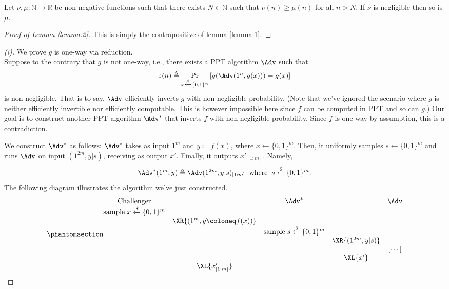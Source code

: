     \begin{lemma}\label{lemma:2}
        Let $\nu,\mu:\mathbb{N}\to \mathbb{R}$ be non-negative functions such that there exists $N\in\mathbb{N}$ such that $\nu(n)\ge \mu(n)$ for all $n\gt N$. If $\nu$ is negligible then so is $\mu$.
    \end{lemma}
    \begin{proof}[Proof of Lemma \ref{lemma:2}]
        This is simply the contrapositive of lemma \ref{lemma:1}.
    \end{proof}
\begin{proof}[(i)]
    We prove $g$ is one-way via reduction.\\
    Suppose to the contrary that $g$ is not one-way, i.e., there exists a PPT algorithm $\Adv$ such that
    \[
    \varepsilon(n)\triangleq \Pr_{x\xleftarrow{\$}\{0,1\}^n}\left[g(\Adv(1^n, g(x))) = g(x)\right]
    \]
    is non-negligible. That is to say, $\Adv$ efficiently inverts $g$ with non-negligible probability. (Note that we've ignored the scenario where $g$ is neither efficiently invertible nor efficiently computable. This is however impossible here since $f$ can be computed in PPT and so can $g$.) Our goal is to construct another PPT algorithm $\Adv^\ast$ that inverts $f$ with non-negligible probability. Since $f$ is one-way by assumption, this is a contradiction.

    We construct $\Adv^\ast$ as follows: $\Adv^\ast$ takes as input $1^{m}$ and $y\coloneq f(x)$, where $x\xleftarrow{}\{0,1\}^m$. Then, it uniformly samples $s\xleftarrow{}\{0,1\}^m$ and runs $\Adv$ on input $(1^{2m}, y|s)$, receiving as output $x'$. Finally, it outputs $x'_{[1:m]}$. Namely,
    \[
    \Adv^\ast(1^{m}, y) \triangleq \Adv(1^{2m}, y|s)_{[1:m]}
    \;\; \text{where} \;\; s\xleftarrow{\$}\{0,1\}^m.
    \]
    \hyperref[diag:adv1]{The following diagram} illustrates the algorithm we've just constructed.
    \[\phantomsection\label{diag:adv1}
        \begin{array}{@{} c c c c c @{}}
        \textrm{Challenger} && \Adv^\ast & & \Adv \\
        \text{sample}\;x\xleftarrow{\$}\{0,1\}^m &&&&\\
        &\XR{(1^m, y\coloneq f(x))} &&&\\
        &&\text{sample}\;s\xleftarrow{\$}\{0,1\}^m &&\\
        &&&\XR{(1^{2m}, y|s)} &\\
        &&&& [\cdots]\\
        &&&\XL{x'} &\\
        &\XL{x'_{[1:m]}} &&&
        \end{array}
    \]


\end{proof}
